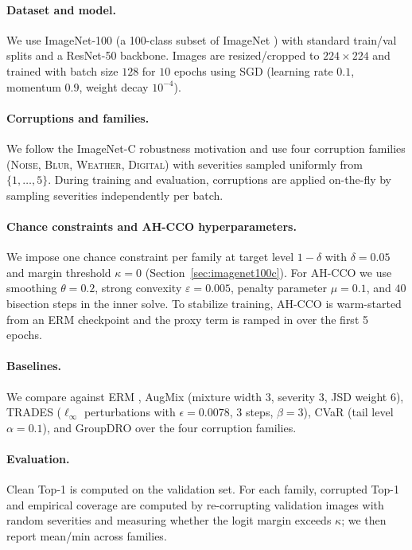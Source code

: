 \documentclass{uai2026} %
\theoremstyle{plain}
\theoremstyle{definition}
\begin{document}
\paragraph{Dataset and model.}
We use ImageNet-100 (a 100-class subset of ImageNet \citep{deng2009imagenet}) with standard train/val splits and a ResNet-50 backbone.
Images are resized/cropped to $224\times 224$ and trained with batch size $128$ for $10$ epochs using SGD (learning rate $0.1$, momentum $0.9$, weight decay $10^{-4}$).

\paragraph{Corruptions and families.}
We follow the ImageNet-C robustness motivation \citep{hendrycks2019benchmarking} and use four corruption families (\textsc{Noise}, \textsc{Blur}, \textsc{Weather}, \textsc{Digital}) with severities sampled uniformly from $\{1,\dots,5\}$.
During training and evaluation, corruptions are applied on-the-fly by sampling severities independently per batch.

\paragraph{Chance constraints and AH-CCO hyperparameters.}
We impose one chance constraint per family at target level $1-\delta$ with $\delta=0.05$ and margin threshold $\kappa=0$ (Section~\ref{sec:imagenet100c}).
For AH-CCO we use smoothing $\theta=0.2$, strong convexity $\varepsilon=0.005$, penalty parameter $\mu=0.1$, and $40$ bisection steps in the inner solve.
To stabilize training, AH-CCO is warm-started from an ERM checkpoint and the proxy term is ramped in over the first 5 epochs.

\paragraph{Baselines.}
We compare against ERM \citep{goodfellow2016deep}, AugMix \citep{hendrycks2020augmix} (mixture width 3, severity 3, JSD weight 6), TRADES \citep{zhang2019theoretically} ($\ell_\infty$ perturbations with $\epsilon{=}0.0078$, 3 steps, $\beta{=}3$), CVaR \citep{rockafellaruryasev2000cvar} (tail level $\alpha{=}0.1$), and GroupDRO \citep{sagawa2020distributionally} over the four corruption families.

\paragraph{Evaluation.}
Clean Top-1 is computed on the validation set.
For each family, corrupted Top-1 and empirical coverage are computed by re-corrupting validation images with random severities and measuring whether the logit margin exceeds $\kappa$; we then report mean/min across families.
\end{document}
